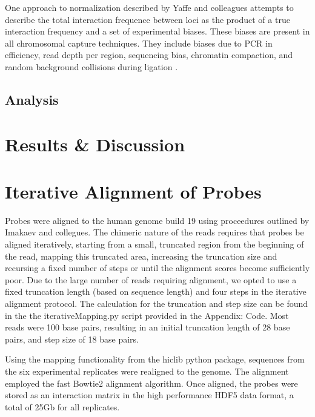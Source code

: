 \documentclass[phd,tocprelim]{cornell}
\begin{document}
One approach to normalization described by Yaffe and colleagues\cite{yaffe2011}
attempts to describe the total interaction frequence between loci as the product
of a true interaction frequency and a set of experimental biases.  These biases
are present in all chromosomal capture techniques.  They include biases due to
PCR in efficiency, read depth per region, sequencing bias, chromatin compaction,
and random background collisions during
ligation\cite{benner2014} \cite{dekker2006}.




\section{Analysis}






\chapter{Results \& Discussion}


%
%

\appendix
\appendixpage
\addappheadtotoc
\chapter{Iterative Alignment of Probes}

Probes were aligned to the human genome build 19 using proceedures outlined by
Imakaev and collegues\cite{imakaev2012}.  The chimeric nature of the reads
requires that probes be aligned iteratively, starting from a small, truncated
region from the beginning of the read, mapping this truncated area, increasing
the truncation size and recursing a fixed number of steps or until the alignment
scores become sufficiently poor.  Due to the large number of reads requiring
alignment, we opted to use a fixed truncation length (based on sequence length)
and four steps in the iterative alignment protocol.  The calculation
for the truncation and step size can be found in the the iterativeMapping.py
script provided in the Appendix: Code.  Most reads were 100 base pairs, resulting
in an initial truncation length of 28 base pairs, and step size of 18 base pairs.

Using the mapping functionality from the hiclib python package\cite{imakaev2012},
sequences from the six experimental replicates were realigned to the genome.  The
alignment employed the fast Bowtie2 alignment algorithm\cite{langmead2012}.  Once
aligned, the probes were stored as an interaction matrix in the high performance
HDF5\cite{hdf5} data format, a total of 25Gb for all replicates.
\end{document}
